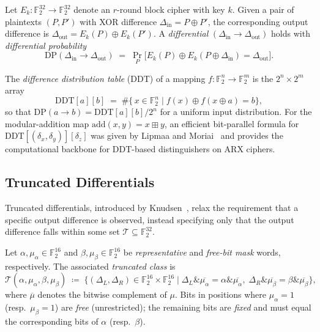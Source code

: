 \documentclass[runningheads]{llncs}
\newcommand{\DDT}{\mathrm{DDT}}
\newcommand{\xor}{\oplus}
\begin{document}
Let $E_k : \mathbb{F}_2^{32} \to \mathbb{F}_2^{32}$ denote an
$r$-round block cipher with key $k$.
Given a pair of plaintexts $(P, P')$ with XOR difference
$\Delta_{\mathrm{in}} = P \xor P'$, the corresponding output difference
is $\Delta_{\mathrm{out}} = E_k(P) \xor E_k(P')$.
A \emph{differential} $(\Delta_{\mathrm{in}} \to \Delta_{\mathrm{out}})$
holds with \emph{differential probability}
\begin{equation}
  \mathrm{DP}(\Delta_{\mathrm{in}} \to \Delta_{\mathrm{out}})
  \;=\;
  \Pr_{P}\!\bigl[E_k(P) \xor E_k(P \xor \Delta_{\mathrm{in}})
        = \Delta_{\mathrm{out}}\bigr].
\end{equation}

The \emph{difference distribution table} (DDT) of a mapping
$f : \mathbb{F}_2^n \to \mathbb{F}_2^m$ is the $2^n \times 2^m$ array
\begin{equation}
  \DDT[a][b]
  \;=\;
  \#\!\bigl\{\, x \in \mathbb{F}_2^n \;\big|\; f(x) \xor f(x \xor a) = b\bigr\},
\end{equation}
so that $\mathrm{DP}(a \to b) = \DDT[a][b] / 2^n$ for a uniform
input distribution.  For the modular-addition map
$\mathrm{add}(x,y) = x \boxplus y$, an efficient bit-parallel formula for
$\DDT[(\delta_x, \delta_y)][\delta_z]$ was given by Lipmaa and
Moriai~\cite{LM01} and provides the computational backbone for DDT-based
distinguishers on ARX ciphers.

\subsection{Truncated Differentials}
\label{subsec:trunc}

Truncated differentials, introduced by Knudsen~\cite{Knu94}, relax
the requirement that a specific output difference is observed, instead
specifying only that the output difference falls within some set
$\mathcal{T} \subseteq \mathbb{F}_2^{32}$.

\begin{definition}
  \label{def:trunc-class}
  Let $\alpha, \mu_\alpha \in \mathbb{F}_2^{16}$ and
  $\beta,  \mu_\beta  \in \mathbb{F}_2^{16}$ be \emph{representative} and
  \emph{free-bit mask} words, respectively.
  The associated \emph{truncated class} is
  \begin{equation}
    \mathcal{T}(\alpha, \mu_\alpha, \beta, \mu_\beta)
    \;\coloneqq\;
    \bigl\{(\Delta_L, \Delta_R) \in \mathbb{F}_2^{16} \times \mathbb{F}_2^{16}
    \;\big|\;
    \Delta_L \mathbin{\&} \overline{\mu_\alpha} = \alpha \mathbin{\&} \overline{\mu_\alpha},\;
    \Delta_R \mathbin{\&} \overline{\mu_\beta}  = \beta  \mathbin{\&} \overline{\mu_\beta}
    \bigr\},
  \end{equation}
  where $\overline{\mu}$ denotes the bitwise complement of $\mu$.
  Bits in positions where $\mu_\alpha = 1$ (resp.\ $\mu_\beta = 1$) are
  \emph{free} (unrestricted); the remaining bits are \emph{fixed} and must
  equal the corresponding bits of $\alpha$ (resp.\ $\beta$).
\end{definition}
\end{document}
